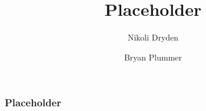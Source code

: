 \documentclass[xcolor=x11names,compress,t]{beamer}
\renewcommand{\(}{\begin{columns}}
\renewcommand{\)}{\end{columns}}
\newcommand{\<}[1]{\begin{column}{#1}}
\renewcommand{\>}{\end{column}}
\begin{document}
\abovedisplayskip=6pt

%
%

\begin{frame}
\title{Placeholder}
\author{Nikoli Dryden \and Bryan Plummer}
\date{}
\titlepage

\end{frame}


\begin{frame}
  \frametitle{Placeholder}
\end{frame}

\end{document}
